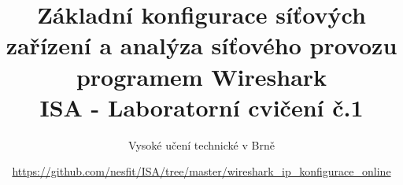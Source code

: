 \documentclass[a4paper,11pt]{article}
\title{Základní konfigurace síťových zařízení a analýza síťového provozu programem Wireshark\\
{\bf\large ISA - Laboratorní cvičení č.1}}
\author{Vysoké učení technické v Brně}
\date{\url{https://github.com/nesfit/ISA/tree/master/wireshark_ip_konfigurace_online}}
\begin{document}
{\let\newpage\relax\maketitle}


\end{document}
